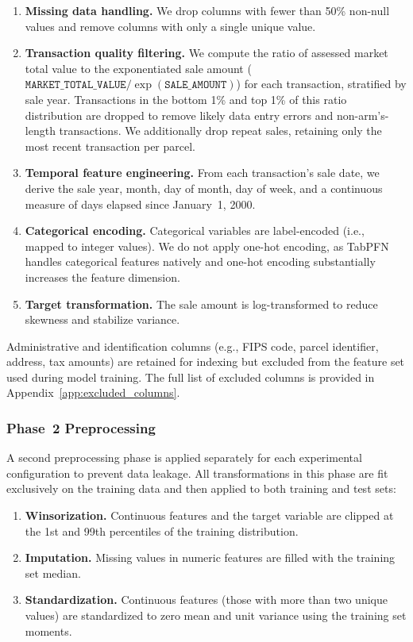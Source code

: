 \begin{enumerate}
    \item \textbf{Missing data handling.} We drop columns with fewer than 50\% non-null values and remove columns with only a single unique value.

    \item \textbf{Transaction quality filtering.} We compute the ratio of assessed market total value to the exponentiated sale amount ($\texttt{MARKET\_TOTAL\_VALUE} / \exp(\texttt{SALE\_AMOUNT})$) for each transaction, stratified by sale year. Transactions in the bottom 1\% and top 1\% of this ratio distribution are dropped to remove likely data entry errors and non-arm's-length transactions. We additionally drop repeat sales, retaining only the most recent transaction per parcel.

    \item \textbf{Temporal feature engineering.} From each transaction's sale date, we derive the sale year, month, day of month, day of week, and a continuous measure of days elapsed since January~1, 2000.

    \item \textbf{Categorical encoding.} Categorical variables are label-encoded (i.e., mapped to integer values). We do not apply one-hot encoding, as TabPFN handles categorical features natively and one-hot encoding substantially increases the feature dimension.

    \item \textbf{Target transformation.} The sale amount is log-transformed to reduce skewness and stabilize variance.
\end{enumerate}

Administrative and identification columns (e.g., FIPS code, parcel identifier, address, tax amounts) are retained for indexing but excluded from the feature set used during model training. The full list of excluded columns is provided in Appendix~\ref{app:excluded_columns}.

\subsubsection{Phase~2 Preprocessing}\label{sec:phase2}

A second preprocessing phase is applied separately for each experimental configuration to prevent data leakage. All transformations in this phase are fit exclusively on the training data and then applied to both training and test sets:

\begin{enumerate}
    \item \textbf{Winsorization.} Continuous features and the target variable are clipped at the 1st and 99th percentiles of the training distribution.
    \item \textbf{Imputation.} Missing values in numeric features are filled with the training set median.
    \item \textbf{Standardization.} Continuous features (those with more than two unique values) are standardized to zero mean and unit variance using the training set moments.
\end{enumerate}

